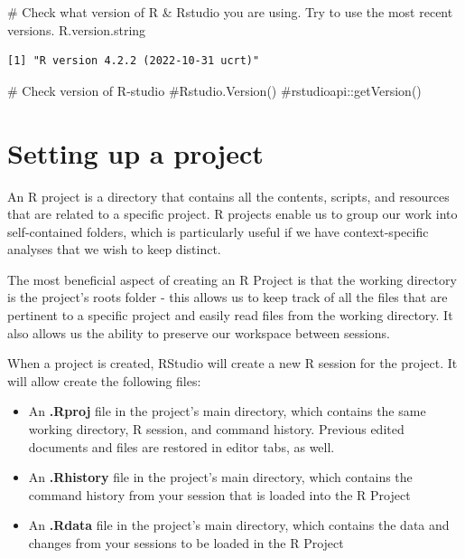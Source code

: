 \documentclass[
  letterpaper,
  DIV=11,
  numbers=noendperiod]{scrreprt}
\newenvironment{Shaded}{\begin{snugshade}}{\end{snugshade}}
\newcommand{\CommentTok}[1]{\textcolor[rgb]{0.37,0.37,0.37}{#1}}
\newcommand{\NormalTok}[1]{\textcolor[rgb]{0.00,0.23,0.31}{#1}}
\providecommand{\tightlist}{%
  \setlength{\itemsep}{0pt}\setlength{\parskip}{0pt}}\usepackage{longtable,booktabs,array}
\begin{document}
\begin{Shaded}
\begin{Highlighting}[]
\CommentTok{\# Check what version of R \& Rstudio you are using. Try to use the most recent versions.}
\NormalTok{R.version.string}
\end{Highlighting}
\end{Shaded}

\begin{verbatim}
[1] "R version 4.2.2 (2022-10-31 ucrt)"
\end{verbatim}

\begin{Shaded}
\begin{Highlighting}[]
\CommentTok{\#   Check version of R{-}studio}
\CommentTok{\#Rstudio.Version()}
\CommentTok{\#rstudioapi::getVersion()}
\end{Highlighting}
\end{Shaded}

\hypertarget{setting-up-a-project}{%
\chapter{Setting up a project}\label{setting-up-a-project}}

An R project is a directory that contains all the contents, scripts, and
resources that are related to a specific project. R projects enable us
to group our work into self-contained folders, which is particularly
useful if we have context-specific analyses that we wish to keep
distinct.

The most beneficial aspect of creating an R Project is that the working
directory is the project's roots folder - this allows us to keep track
of all the files that are pertinent to a specific project and easily
read files from the working directory. It also allows us the ability to
preserve our workspace between sessions.

When a project is created, RStudio will create a new R session for the
project. It will allow create the following files:

\begin{itemize}
\tightlist
\item
  An \textbf{.Rproj} file in the project's main directory, which
  contains the same working directory, R session, and command history.
  Previous edited documents and files are restored in editor tabs, as
  well.
\item
  An \textbf{.Rhistory} file in the project's main directory, which
  contains the command history from your session that is loaded into the
  R Project
\item
  An \textbf{.Rdata} file in the project's main directory, which
  contains the data and changes from your sessions to be loaded in the R
  Project
\end{itemize}
\end{document}
